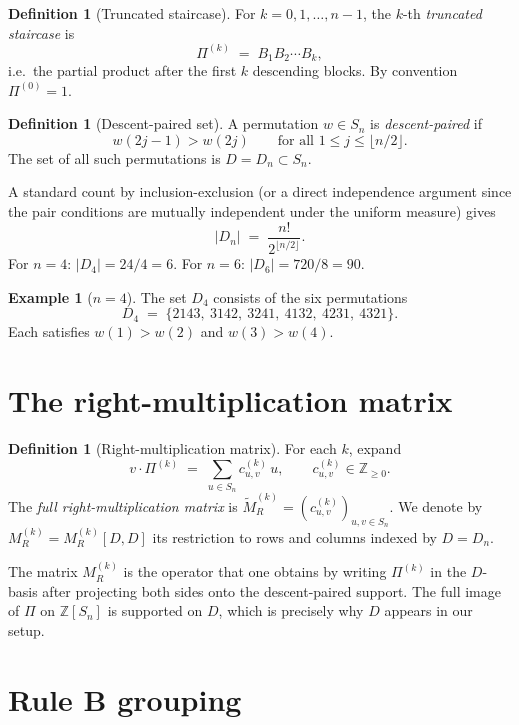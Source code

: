 \documentclass[11pt]{article}
\theoremstyle{definition}
\newtheorem{definition}[theorem]{Definition}
\newtheorem{example}[theorem]{Example}
\begin{document}
\begin{definition}[Truncated staircase]
For $k = 0,1,\dots,n-1$, the $k$-th \emph{truncated staircase} is
\[
\Pi^{(k)} \;=\; B_1 B_2 \cdots B_k,
\]
i.e.\ the partial product after the first $k$ descending blocks. By convention $\Pi^{(0)} = 1$.
\end{definition}

\begin{definition}[Descent-paired set]
A permutation $w \in S_n$ is \emph{descent-paired} if
\[
w(2j-1) > w(2j) \qquad \text{for all } 1 \le j \le \lfloor n/2 \rfloor.
\]
The set of all such permutations is $D = D_n \subset S_n$.
\end{definition}

A standard count by inclusion-exclusion (or a direct independence argument since the pair conditions are mutually independent under the uniform measure) gives
\[
|D_n| \;=\; \frac{n!}{2^{\lfloor n/2 \rfloor}}.
\]
For $n=4$: $|D_4| = 24/4 = 6$. For $n=6$: $|D_6| = 720/8 = 90$.

\begin{example}[$n=4$]
\label{ex:D4}
The set $D_4$ consists of the six permutations
\[
D_4 \;=\; \{2143,\ 3142,\ 3241,\ 4132,\ 4231,\ 4321\}.
\]
Each satisfies $w(1) > w(2)$ and $w(3) > w(4)$.
\end{example}

\section{The right-multiplication matrix}

\begin{definition}[Right-multiplication matrix]
For each $k$, expand
\[
v \cdot \Pi^{(k)} \;=\; \sum_{u \in S_n} c_{u,v}^{(k)}\, u, \qquad c_{u,v}^{(k)} \in \mathbb{Z}_{\ge 0}.
\]
The \emph{full right-multiplication matrix} is $\widetilde M_R^{(k)} = (c_{u,v}^{(k)})_{u,v \in S_n}$. We denote by $M_R^{(k)} = M_R^{(k)}[D,D]$ its restriction to rows and columns indexed by $D = D_n$.
\end{definition}

The matrix $M_R^{(k)}$ is the operator that one obtains by writing $\Pi^{(k)}$ in the $D$-basis after projecting both sides onto the descent-paired support. The full image of $\Pi$ on $\mathbb{Z}[S_n]$ is supported on $D$, which is precisely why $D$ appears in our setup.

\section{Rule B grouping}
\end{document}
